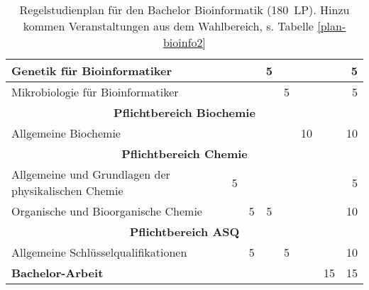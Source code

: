 \begin{table}[tbp]
\begin{small}
\begin{tabularx}{\textwidth}{|X||c|c|c|c|c|c||r|}
    Genetik für Bioinformatiker&&&5&&&&5\\\hline
    Mikrobiologie für Bioinformatiker&&&&5&&&5\\\hline\hline
    \multicolumn{8}{|c|}{\textbf{Pflichtbereich Biochemie}}\\\hline
    Allgemeine Biochemie&&&&&10&&10\\\hline\hline
    \multicolumn{8}{|c|}{\textbf{Pflichtbereich Chemie}}\\\hline
    Allgemeine und Grundlagen der physikalischen Chemie&5&&&&&&5\\\hline
    Organische und Bioorganische Chemie&&5&5&&&&10\\\hline\hline
    \multicolumn{8}{|c|}{\textbf{Pflichtbereich ASQ}}\\\hline
    Allgemeine Schlüsselqualifikationen&&5&&5&&&10\\\hline\hline
    \textbf{Bachelor-Arbeit}&&&&&&15&15\\\hline
    \end{tabularx}
    \end{small}
    \caption{Regelstudienplan für den Bachelor Bioinformatik (180~LP). Hinzu kommen Veranstaltungen aus dem Wahlbereich, s. Tabelle \ref{plan-bioinfo2} \label{plan-bioinfo}}
\end{table}

